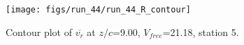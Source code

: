\begin{figure}[H]
\centering
\texttt{[image: figs/run\_44/run\_44\_R\_contour]}
\caption{Contour plot of $\overline{v_{r}}$ at $z/c$=9.00, $V_{free}$=21.18, station 5.}
\label{fig:run_44_R_contour}
\end{figure}


